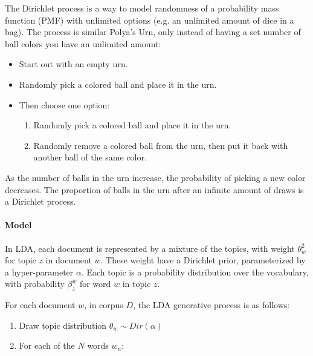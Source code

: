 \documentclass[12pt]{report}
\begin{document}
The Dirichlet process is a way to model randomness of a probability mass
function (PMF) with unlimited options (e.g. an unlimited amount of dice in a
bag). The process is similar Polya’s Urn, only instead of having a set number
of ball colors you have an unlimited amount:

\begin{itemize}
\item Start out with an empty urn.
\item Randomly pick a colored ball and place it in the urn.
\item Then choose one option:
\begin{enumerate}
\item Randomly pick a colored ball and place it in the urn.
\item Randomly remove a colored ball from the urn, then put it back with another 
ball of the same color.
\end{enumerate}
\end{itemize}
 
As the number of balls in the urn increase, the probability of picking a new
color decreases. The proportion of balls in the urn after an infinite amount of
draws is a Dirichlet process.


\paragraph{Model}


In LDA, each document is represented by a mixture of the topics, with weight
$\theta_w^2$ for topic $z$ in document $w$. These weight have a Dirichlet prior,
parameterized by a hyper-parameter $\alpha$. Each topic is a probability
distribution over the vocabulary, with probability $\beta^w_z$ for word $w$ in
topic $z$.
 
For each document $w$, in corpus $D$, the LDA generative process is as follows:

\begin{enumerate}
	\item Draw topic distribution $\theta_w \sim Dir(\alpha)$
	\item For each of the $N$ words $w_n$:
\end{enumerate}
\end{document}
